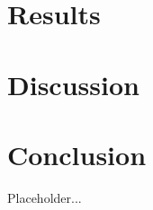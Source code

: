 \documentclass[10pt, a4paper, twocolumn]{article} %
\begin{document}
\section{Results}


\section{Discussion}


\section{Conclusion}
Placeholder...


\printbibliography[title={Bibliography}] %


\end{document}
